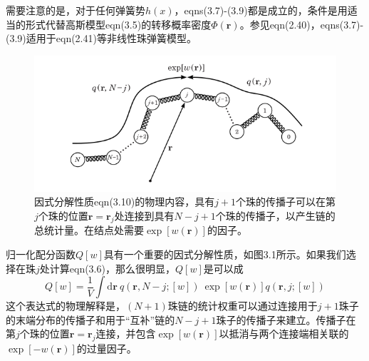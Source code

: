 需要注意的是，对于任何弹簧势$h(x)$，eqns(3.7)-(3.9)都是成立的，条件是用适当的形式代替高斯模型eqn(3.5)的转移概率密度$\Phi(\mathbf{r})$。参见eqn(2.40)，eqns(3.7)-(3.9)适用于eqn(2.41)等非线性珠弹簧模型。
\begin{figure}[H]
\centering
\includegraphics[scale=0.7]{./figures/Figure_1.png}
\caption{因式分解性质eqn(3.10)的物理内容，具有$j+1$个珠的传播子可以在第$j$个珠的位置$\mathbf{r}=\mathbf{r}_j$处连接到具有$N-j+1$个珠的传播子，以产生链的总统计量。在结点处需要$\exp[w(\mathbf{r})]$的因子。}
\end{figure}
归一化配分函数$Q[w]$具有一个重要的因式分解性质，如图3.1所示。如果我们选择在珠$j$处计算eqn(3.6)，那么很明显，$Q[w]$是可以成
\begin{equation}
Q[w]=\frac{1}{V}\int\mathrm{d}\mathbf{r}~q(\mathbf{r},N-j;[w])~\exp[w(\mathbf{r})]q(\mathbf{r},j;[w])
\end{equation}
这个表达式的物理解释是，$(N+1)$珠链的统计权重可以通过连接用于$j+1$珠子的末端分布的传播子和用于“互补”链的$N-j+1$珠子的传播子来建立。传播子在第$j$个珠的位置$\mathbf{r}=\mathbf{r}_j$连接，并包含$\exp[w(\mathbf{r})]$以抵消与两个连接端相关联的$\exp[-w(\mathbf{r})]$的过量因子。

